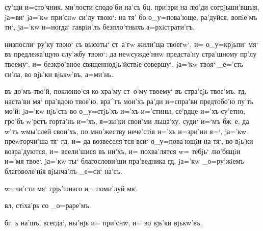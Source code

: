 
 су'щи и=сто'чник\ъ, ми'лости сподо'би на'съ 
бц, при'зри на лю'ди согрjьши'вшыя, jа=ви` jа='кw 
при'снw си'лу твою`: на тя' бо о_у=пова'юще, ра'дуйся, 
вопiе'мъ ти`, jа='кw и=ногда` гаврiи'лъ безпло'тныхъ 
а=рхiстрати'гъ.


 низпосли` ру'ку твою` съ высоты` ст~а'гw 
жили'ща твоегw`, и= о_у=крjьпи` мя` въ предлежа'щую 
слу'жбу твою`: да неwсужде'ннw предста'ну стра'шному 
пр'лу твоему`, и= безкро'вное священнодjь'йствiе 
совершу`, jа='кw твоя` _е='сть си'ла, во вjь'ки вjькw'въ, 
а=ми'нь.


 въ до'мъ тво'й, поклоню'ся ко хра'му ст~о'му 
твоему` въ стра'сjь твое'мъ. гд, наста'ви мя` пра'вдою 
твое'ю, вра^гъ мои'хъ ра'ди и=спра'ви пред\ъ тобо'ю пу'ть 
мо'й: jа='кw нjь'сть во о_у=стjь'хъ и='хъ и='стины, 
се'рдце и='хъ су'етно, гро'бъ w'рстъ горта'нь и='хъ, 
я=зы'ки свои'ми льща'ху. суди` и=`мъ бж~е, да w'тъ 
w\т мы'слей свои'хъ, по мно'жеству нече'стiя и='хъ 
и=зри'ни я=`, jа='кw преwгорчи'ша тя` гд. и= да 
возвеселя'тся вси` о_у=пова'ющiи на тя`, во вjь'ки 
возра'дуются, и= всели'шися въ ни'хъ, и= похва'лятся w= 
тебjь` лю'бящiи и='мя твое`. jа='кw ты` благослови'ши 
пра'ведника гд, jа='кw _о=ру'жiемъ благоволе'нiя 
вjьнча'лъ _е=си` на'съ.


 w=чи'сти мя` грjь'шнаго и= поми'луй мя`.


 вл, стiха'рь со _о=раре'мъ.


 бг~ъ на'шъ, всегда`, ны'нjь и= при'снw, 
и= во вjь'ки вjькw'въ.


